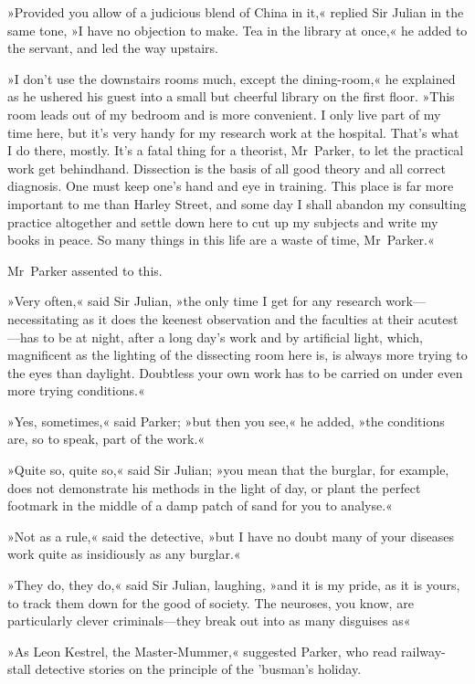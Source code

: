 »Provided you allow of a judicious blend of China in it,« replied Sir Julian in the same tone, »I have no objection to make. Tea in the library at once,« he added to the servant, and led the way upstairs.

»I don't use the downstairs rooms much, except the dining-room,« he explained as he ushered his guest into a small but cheerful library on the first floor. »This room leads out of my bedroom and is more convenient. I only live part of my time here, but it's very handy for my research work at the hospital. That's what I do there, mostly. It's a fatal thing for a theorist, Mr~Parker, to let the practical work get behindhand. Dissection is the basis of all good theory and all correct diagnosis. One must keep one's hand and eye in training. This place is far more important to me than Harley Street, and some day I shall abandon my consulting practice altogether and settle down here to cut up my subjects and write my books in peace. So many things in this life are a waste of time, Mr~Parker.«

Mr~Parker assented to this.

»Very often,« said Sir Julian, »the only time I get for any research work—necessitating as it does the keenest observation and the faculties at their acutest—has to be at night, after a long day's work and by artificial light, which, magnificent as the lighting of the dissecting room here is, is always more trying to the eyes than daylight. Doubtless your own work has to be carried on under even more trying conditions.«

»Yes, sometimes,« said Parker; »but then you see,« he added, »the conditions are, so to speak, part of the work.«

»Quite so, quite so,« said Sir Julian; »you mean that the burglar, for example, does not demonstrate his methods in the light of day, or plant the perfect footmark in the middle of a damp patch of sand for you to analyse.«

»Not as a rule,« said the detective, »but I have no doubt many of your diseases work quite as insidiously as any burglar.«

»They do, they do,« said Sir Julian, laughing, »and it is my pride, as it is yours, to track them down for the good of society. The neuroses, you know, are particularly clever criminals—they break out into as many disguises as\longdash«

»As Leon Kestrel, the Master-Mummer,« suggested Parker, who read railway-stall detective stories on the principle of the 'busman's holiday.

